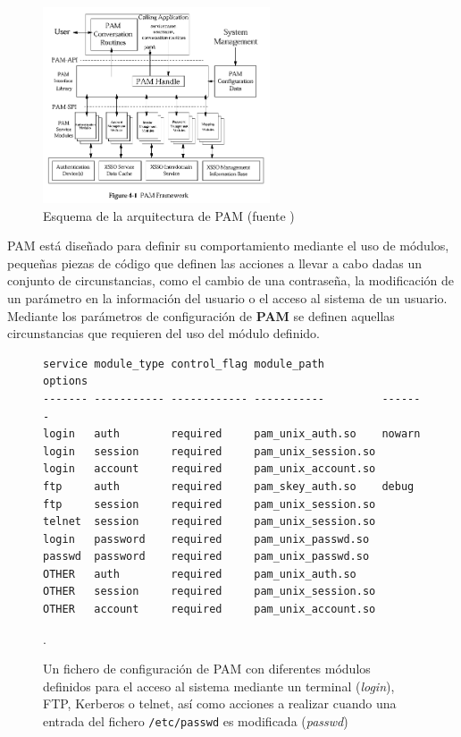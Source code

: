 \begin{figure}[H]
\centering
  \immediate{}
  \includegraphics[width=0.6\textwidth]{Chapter2/Figures/pamstructure.png}
  \caption[Esquema de la arquitectura de PAM]{Esquema de la arquitectura de PAM (fuente \cite{opengroup:rfc86.0})}
\end{figure}

PAM está diseñado para definir su comportamiento mediante el uso de módulos, pequeñas piezas de código que definen las acciones a llevar a cabo dadas un conjunto de circunstancias, como el cambio de una contraseña, la modificación de un parámetro en la información del usuario o el acceso al sistema de un usuario. Mediante los parámetros de configuración de \textbf{PAM} se definen aquellas circunstancias que requieren del uso del módulo definido.

\begin{figure}[H]
\centering
\begin{lstlisting}
service module_type control_flag module_path         options
------- ----------- ------------ -----------         -------
login   auth        required     pam_unix_auth.so    nowarn
login   session     required     pam_unix_session.so
login   account     required     pam_unix_account.so
ftp     auth        required     pam_skey_auth.so    debug
ftp     session     required     pam_unix_session.so
telnet  session     required     pam_unix_session.so
login   password    required     pam_unix_passwd.so
passwd  password    required     pam_unix_passwd.so
OTHER   auth        required     pam_unix_auth.so
OTHER   session     required     pam_unix_session.so
OTHER   account     required     pam_unix_account.so
\end{lstlisting}

\caption[Fichero de configuración de PAM]{Un fichero de configuración de PAM con diferentes módulos definidos para el acceso al sistema mediante un terminal (\textit{login}), FTP, Kerberos o telnet, así como acciones a realizar cuando una entrada del fichero \texttt{/etc/passwd} es modificada (\textit{passwd})}.
\end{figure}

